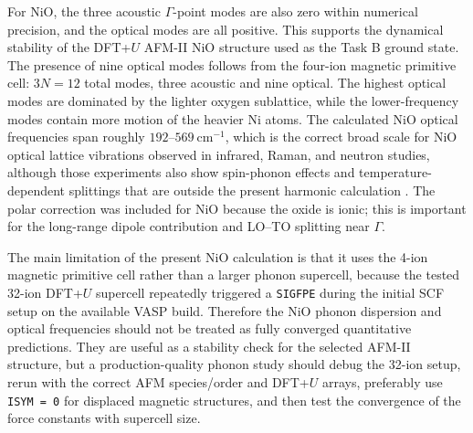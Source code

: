 For NiO, the three acoustic \(\Gamma\)-point modes are also zero within
numerical precision, and the optical modes are all positive.  This supports the
dynamical stability of the DFT+\(U\) AFM-II NiO structure used as the Task B
ground state.  The presence of nine optical modes follows from the four-ion
magnetic primitive cell: \(3N=12\) total modes, three acoustic and nine optical.
The highest optical modes are dominated by the lighter oxygen sublattice, while
the lower-frequency modes contain more motion of the heavier Ni atoms.  The
calculated NiO optical frequencies span roughly \(192\)--\(569~\mathrm{cm^{-1}}\),
which is the correct broad scale for NiO optical lattice vibrations observed in
infrared, Raman, and neutron studies, although those experiments also show
spin-phonon effects and temperature-dependent splittings that are outside the
present harmonic calculation \cite{lacerda-nio-phonon,sun-nio-phonon}.  The
polar correction was included for NiO because the oxide is ionic; this is
important for the long-range dipole contribution and LO--TO splitting near
\(\Gamma\).

The main limitation of the present NiO calculation is that it uses the
4-ion magnetic primitive cell rather than a larger phonon supercell, because
the tested 32-ion DFT+\(U\) supercell repeatedly triggered a \texttt{SIGFPE}
during the initial SCF setup on the available VASP build.  Therefore the NiO
phonon dispersion and optical frequencies should not be treated as fully
converged quantitative predictions.  They are useful as a stability check for
the selected AFM-II structure, but a production-quality phonon study should
debug the 32-ion setup, rerun with the correct AFM species/order and DFT+\(U\)
arrays, preferably use \texttt{ISYM = 0} for displaced magnetic structures, and
then test the convergence of the force constants with supercell size.
